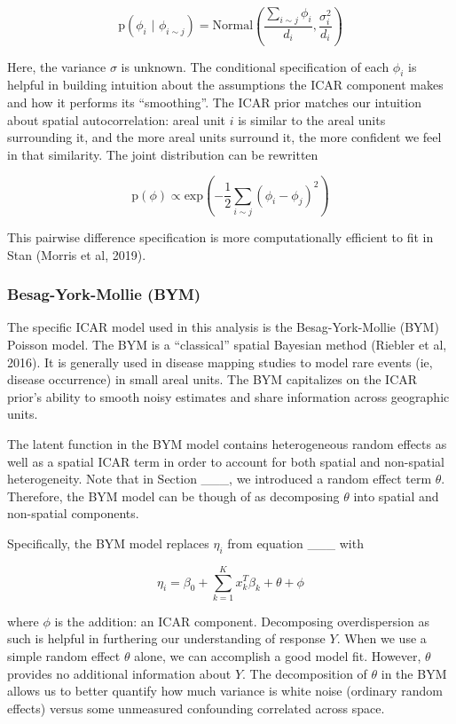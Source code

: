 \documentclass[]{article}
\begin{document}
\[
\text{p}(\phi_i \text{ | } \phi_{i \sim j}) = \text{Normal}(\frac{\sum_{i \sim j}\phi_i}{d_i}, \frac{\sigma_i^2}{d_i})
\]

Here, the variance \(\sigma\) is unknown. The conditional specification
of each \(\phi_i\) is helpful in building intuition about the
assumptions the ICAR component makes and how it performs its
``smoothing''. The ICAR prior matches our intuition about spatial
autocorrelation: areal unit \(i\) is similar to the areal units
surrounding it, and the more areal units surround it, the more confident
we feel in that similarity. The joint distribution can be rewritten

\[
\text{p}(\phi) \propto \text{exp}(-\frac{1}{2}\sum_{i \sim j}(\phi_i - \phi_j)^2)
\]

This pairwise difference specification is more computationally efficient
to fit in Stan (Morris et al, 2019).

\subsubsection{Besag-York-Mollie (BYM)}\label{besag-york-mollie-bym}

The specific ICAR model used in this analysis is the Besag-York-Mollie
(BYM) Poisson model. The BYM is a ``classical'' spatial Bayesian method
(Riebler et al, 2016). It is generally used in disease mapping studies
to model rare events (ie, disease occurrence) in small areal units. The
BYM capitalizes on the ICAR prior's ability to smooth noisy estimates
and share information across geographic units.

The latent function in the BYM model contains heterogeneous random
effects as well as a spatial ICAR term in order to account for both
spatial and non-spatial heterogeneity. Note that in Section \_\_\_, we
introduced a random effect term \(\theta\). Therefore, the BYM model can
be though of as decomposing \(\theta\) into spatial and non-spatial
components.

Specifically, the BYM model replaces \(\eta_i\) from equation \_\_\_
with

\[
\eta_i = \beta_0 + \sum_{k=1}^{K}x_k^T\beta_k + \theta + \phi
\]

where \(\phi\) is the addition: an ICAR component. Decomposing
overdispersion as such is helpful in furthering our understanding of
response \(Y\). When we use a simple random effect \(\theta\) alone, we
can accomplish a good model fit. However, \(\theta\) provides no
additional information about \(Y\). The decomposition of \(\theta\) in
the BYM allows us to better quantify how much variance is white noise
(ordinary random effects) versus some unmeasured confounding correlated
across space.
\end{document}
